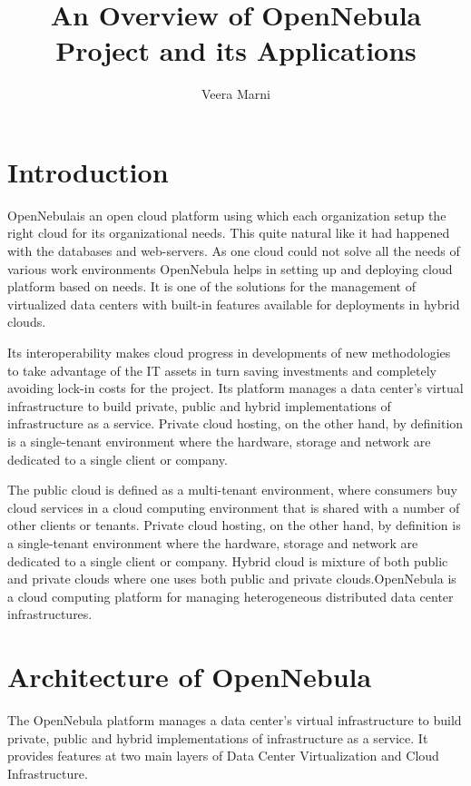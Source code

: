 \documentclass[9pt,twocolumn,twoside]{styles/osajnl}
\title{An Overview of OpenNebula Project and its Applications}
\author[1]{Veera Marni}
\affil[1]{School of Informatics and Computing, Bloomington, IN 47408, U.S.A.}
\affil[*]{Corresponding authors: vmarni@umail.iu.edu}
\begin{document}
\maketitle

\section{Introduction} 

{OpenNebula}\cite{www-wiki-opennebula}is an open cloud platform 
using which each organization setup the right cloud for its 
organizational needs. This quite natural like it had happened with the 
databases and web-servers. {As one cloud could not solve all the 
needs of various work environments OpenNebula helps in setting up and 
deploying cloud platform based on needs}\cite{www-about-opennebula}. 
It is one of the solutions for the management of virtualized data centers
with built-in features available for deployments in hybrid clouds.

Its interoperability makes cloud progress in developments of new 
methodologies to take advantage of the IT assets in turn saving 
investments and completely avoiding lock-in costs for the project. 
Its platform manages a data center's virtual infrastructure to build 
private, public and hybrid implementations of infrastructure as a 
service. Private cloud hosting, on the other hand, by definition is a single-tenant 
environment where the hardware, storage and network are dedicated to a 
single client or company. 

The public cloud is defined as a multi-tenant 
environment, where consumers buy cloud services in a cloud computing environment 
that is shared with a number of other clients or tenants. Private cloud hosting, 
on the other hand, by definition is a single-tenant environment where the 
hardware, storage and network are dedicated to a single client or company. Hybrid 
cloud is mixture of both public and private clouds where one uses both public 
and private clouds.OpenNebula is a cloud computing platform for managing heterogeneous
distributed data center infrastructures.

\section{Architecture of OpenNebula}

The OpenNebula platform manages a data center's virtual infrastructure 
to build private, public and hybrid implementations of infrastructure as 
a service. It provides features at two main layers of Data Center 
Virtualization and Cloud Infrastructure.
\end{document}
